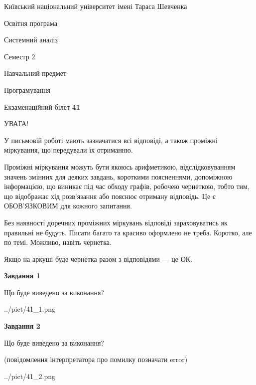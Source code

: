 \documentclass[12pt, ukrainian]{article}
\begin{document}
{{\begin {small}\par
{ \center  Київський національний університет імені Тараса Шевченка \par}
{\parbox {5 cm}{Освітня програма \hfill}{\parbox {7 cm}{Системний аналіз \hfill}}\parbox {6 cm}{\hfill Семестр 2}}\par
{\parbox {5 cm} {Навчальний предмет \hfill}\parbox {7 cm}{Програмування \hfill}\parbox {6cm}{\hfill}\par}\vspace{-7pt} \end{small}}{\center Екзаменаційний білет \No \textbf
{ 41 }\par}}
{
\begin {large}
УВАГА!

У письмовій роботі мають зазначатися всі відповіді, а також проміжні міркування, що передували їх отриманню.

Проміжні міркування можуть бути якоюсь арифметикою, відслідковуванням зна\-чень змінних для деяких завдань,
короткими поясненнями, допоміжною інформацією, що виникає під час обходу графів, робочею чернеткою,
тобто тим, що відображає хід розв’язання або пояснює отриману відповідь.
Це є ОБОВ’ЯЗКОВИМ для кожного запитання.

Без наявності доречних проміжних міркувань відповіді зараховуватись як правиль\-ні не будуть.
Писати багато та красиво оформлено не треба. Коротко, але по темі. Можли\-во, навіть чернетка.

Якщо на аркуші буде чернетка разом з відповідями --- це ОК.

\newpage

{\begin {center}\textbf{Завдання 1}\end {center}}\par
Що буде виведено за виконання?\par
\begin{center}
	{../pict/41_1.png}
\end{center}
\newpage

{\begin {center}\textbf{Завдання 2}\end {center}}\par
Що буде виведено за виконання?\par
 (повідомлення інтерпретатора про помилку позначати error)\par
\begin{center}
	{../pict/41_2.png}
\end{center}
\newpage


\end{large}}
\end{document}
